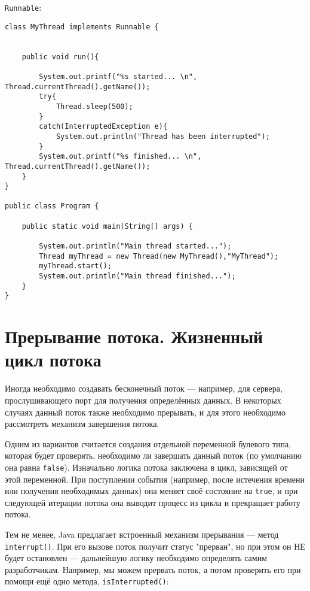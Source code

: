 \verb|Runnable|:

\begin{lstlisting}
class MyThread implements Runnable {
      
     
    public void run(){
          
        System.out.printf("%s started... \n", Thread.currentThread().getName());
        try{
            Thread.sleep(500);
        }
        catch(InterruptedException e){
            System.out.println("Thread has been interrupted");
        }
        System.out.printf("%s finished... \n", Thread.currentThread().getName());
    }
} 
  
public class Program {
  
    public static void main(String[] args) {
          
        System.out.println("Main thread started...");
        Thread myThread = new Thread(new MyThread(),"MyThread");
        myThread.start();
        System.out.println("Main thread finished...");
    }
}
\end{lstlisting}

\section{Прерывание потока. Жизненный цикл потока}

Иногда необходимо создавать бесконечный поток — например, для сервера, прослушивающего порт для получения определённых данных. В некоторых случаях данный поток также необходимо прерывать, и для этого необходимо рассмотреть механизм завершения потока.

Одним из вариантов считается создания отдельной переменной булевого типа, которая будет проверять, необходимо ли завершать данный поток (по умолчанию она равна \verb|false|). Изначально логика потока заключена в цикл, зависящей от этой переменной.  При поступлении события (например, после истечения времени или получения необходимых данных) она меняет своё состояние на \verb|true|, и при следующей итерации потока она выводит процесс из цикла и прекращает работу потока.

Тем не менее, Java предлагает встроенный механизм прерывания — метод \verb|interrupt()|. При его вызове поток получит статус "прерван", но при этом он НЕ будет остановлен — дальнейшую логику необходимо определять самим разработчикам. Например, мы можем прервать поток, а потом проверить его при помощи ещё одно метода, \verb|isInterrupted()|:

